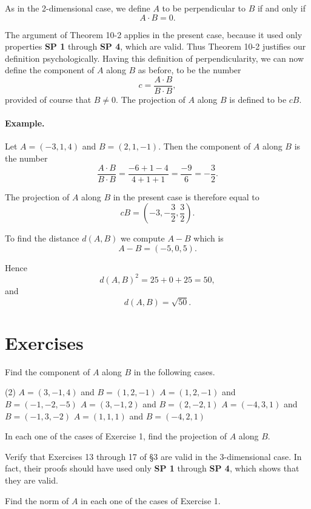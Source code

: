 \documentclass[12pt]{book} %
\begin{document}
\begin{ExerciseList}

As in the 2-dimensional case, we define $A$ to be perpendicular to $B$ if and only if
\[
A\cdot B=0.
\]

The argument of Theorem 10-2 applies in the present case, because it used only properties \textbf{SP 1} through \textbf{SP 4}, which are valid. Thus Theorem 10-2 justifies our definition psychologically. Having this definition of perpendicularity, we can now define the component of $A$ along $B$ as before, to be the number
\[
c=\frac{A\cdot B}{B\cdot B},
\]
provided of course that $B\ne 0$. The projection of $A$ along $B$ is defined to be $cB$.

\paragraph{Example.}
Let $A=(-3,1,4)$ and $B=(2,1,-1)$. Then the component of $A$ along $B$ is the number
\[
\frac{A\cdot B}{B\cdot B}
=
\frac{-6+1-4}{4+1+1}
=
\frac{-9}{6}
=
-\frac32.
\]

The projection of $A$ along $B$ in the present case is therefore equal to
\[
cB=\left(-3,-\frac32,\frac32\right).
\]

To find the distance $d(A,B)$ we compute $A-B$ which is
\[
A-B=(-5,0,5).
\]

Hence
\[
d(A,B)^2=25+0+25=50,
\]
and
\[
d(A,B)=\sqrt{50}.
\]

\section*{Exercises}

\setcounter{Exercise}{0}
\begin{ExerciseList}
\Exercise Find the component of $A$ along $B$ in the following cases.
\begin{tasks}(2)
\task[(a)] $A=(3,-1,4)$ and $B=(1,2,-1)$
\task[(b)] $A=(1,2,-1)$ and $B=(-1,-2,-5)$
\task[(c)] $A=(3,-1,2)$ and $B=(2,-2,1)$
\task[(d)] $A=(-4,3,1)$ and $B=(-1,3,-2)$
\task[(e)] $A=(1,1,1)$ and $B=(-4,2,1)$
\end{tasks}

\Exercise In each one of the cases of Exercise 1, find the projection of $A$ along $B$.

\Exercise Verify that Exercises 13 through 17 of \S3 are valid in the 3-dimensional case. In fact, their proofs should have used only \textbf{SP 1} through \textbf{SP 4}, which shows that they are valid.

\Exercise Find the norm of $A$ in each one of the cases of Exercise 1.


\end{ExerciseList}
\end{ExerciseList}
\end{document}
